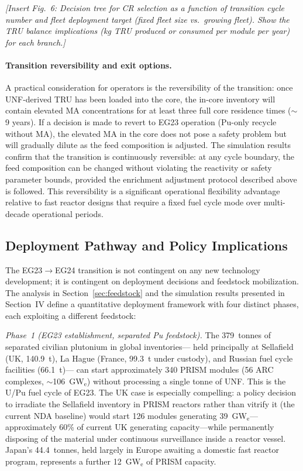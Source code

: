 \documentclass[10pt,twoside]{article}
\newcommand{\placeholder}[1]{%
  \textcolor{placeholder}{\textit{[#1]}}}
\begin{document}
\placeholder{Insert Fig.~6: Decision tree for CR selection
  as a function of transition cycle number and fleet
  deployment target (fixed fleet size vs.\ growing fleet).
  Show the TRU balance implications (kg TRU produced or
  consumed per module per year) for each branch.}

\paragraph{Transition reversibility and exit options.}
A practical consideration for operators is the reversibility
of the transition: once UNF-derived TRU has been loaded into
the core, the in-core inventory will contain elevated MA
concentrations for at least three full core residence times
($\sim$9 years).  If a decision is made to revert to EG23
operation (Pu-only recycle without MA), the elevated MA
in the core does not pose a safety problem but will gradually
dilute as the feed composition is adjusted.  The simulation
results confirm that the transition is continuously
reversible: at any cycle boundary, the feed composition
can be changed without violating the reactivity or safety
parameter bounds, provided the enrichment adjustment
protocol described above is followed.  This reversibility
is a significant operational flexibility advantage relative
to fast reactor designs that require a fixed fuel cycle
mode over multi-decade operational periods.

\subsection{Deployment Pathway and Policy Implications}

The EG23$\rightarrow$EG24 transition is not contingent on any new
technology development; it is contingent on deployment decisions and feedstock
mobilization.  The analysis in Section~\ref{sec:feedstock} and the simulation
results presented in Section~IV define a quantitative deployment framework
with four distinct phases, each exploiting a different feedstock:

\textit{Phase~1 (EG23 establishment, separated Pu feedstock).}
The 379~tonnes of separated civilian plutonium in global inventories---
held principally at Sellafield (UK, 140.9~t), La Hague (France,
99.3~t under custody), and Russian fuel cycle facilities (66.1~t)---
can start approximately 340 PRISM modules (56 ARC complexes,
$\sim$106~GW$_\text{e}$) without processing a single tonne of UNF\@.
This is the U/Pu fuel cycle of EG23.  The UK case is
especially compelling: a policy decision to irradiate the Sellafield
inventory in PRISM reactors rather than vitrify it (the current
NDA baseline) would start 126 modules generating 39~GW$_\text{e}$---
approximately 60\% of current UK generating capacity---while
permanently disposing of the material under continuous surveillance
inside a reactor vessel.  Japan's 44.4~tonnes, held largely in Europe
awaiting a domestic fast reactor program, represents a further
12~GW$_\text{e}$ of PRISM capacity.
\end{document}
